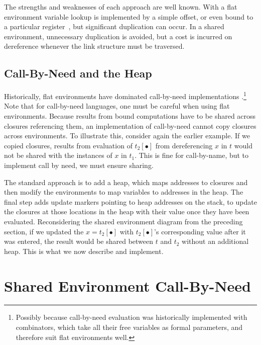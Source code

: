 \documentclass[preprint]{sigplanconf}
\begin{document}
The strengths and weaknesses of each approach are well known.  With a flat
environment variable lookup is implemented by a simple offset, or even
bound to a particular register~\cite{jonesstg, appel2006compiling},
but significant duplication can occur.  In a shared environment, unnecessary
duplication is avoided, but a cost is incurred on dereference whenever the
link structure must be traversed.

\subsection{Call-By-Need and the Heap}

Historically, flat environments have dominated call-by-need implementations
\cite{jonesstg, TIM, johnsson1984efficient,
  boquist1997grin}.\footnote{Possibly because
call-by-need evaluation was historically implemented with combinators, which take all their free variables
as formal parameters, and therefore suit flat environments well.}
Note that
for call-by-need languages, one must be careful when using flat
environments.  Because results from bound computations have to be shared across
closures referencing them, an implementation of call-by-need cannot copy closures
across environments. To illustrate this, consider again the earlier example.
If we copied closures, results from evaluation of $t_2[\bullet]$ from
dereferencing $x$ in $t$ would not be shared with the instances of $x$ in $t_1$.
This is fine for call-by-name, but to implement call by need, we must ensure
sharing.

The standard approach is to add a heap, which maps addresses to closures
\cite{jonesstg, TIM, johnsson1984efficient, sestoft} and then
modify the environments to map variables to addresses in the heap. The final
step adds update markers pointing to heap addresses on the stack, to update
the closures at those locations in the heap with their value once they have been
evaluated.  Reconsidering
the shared
environment diagram from the preceding section, if we updated the
$x=t_2[\bullet]$ with $t_2[\bullet]$'s corresponding value after it was
entered, the result would be shared between $t$ and $t_2$ without
an additional heap. This is what we now describe and implement.

\section{Shared Environment Call-By-Need} \label{sec:calc}
\end{document}
